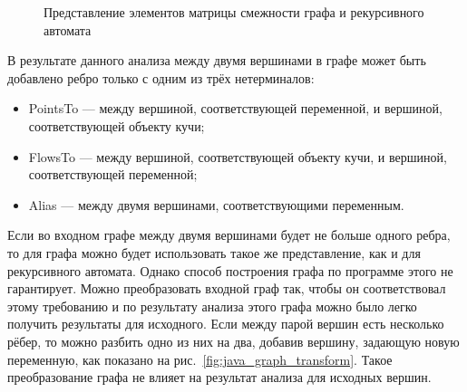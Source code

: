 \begin{figure}[h!]
  \centering
  \caption{Представление элементов матрицы смежности графа и рекурсивного автомата}
  \label{fig:java_graph_representation}
\end{figure}

В результате данного анализа между двумя вершинами в графе может быть добавлено ребро только с одним из трёх нетерминалов:
\begin{itemize}
    \item PointsTo --- между вершиной, соответствующей переменной, и вершиной, соответствующей объекту кучи;
    \item FlowsTo --- между вершиной, соответствующей объекту кучи, и вершиной, соответствующей переменной;
    \item Alias --- между двумя вершинами, соответствующими переменным.
\end{itemize}

Если во входном графе между двумя вершинами будет не больше одного ребра, то для графа можно будет использовать такое же представление, как и для рекурсивного автомата. Однако способ построения графа по программе этого не гарантирует. Можно преобразовать входной граф так, чтобы он соответствовал этому требованию и по результату анализа этого графа можно было легко получить результаты для исходного. Если между парой вершин есть несколько рёбер, то можно разбить одно из них на два, добавив вершину, задающую новую переменную, как показано на рис.~\ref{fig:java_graph_transform}. Такое преобразование графа не влияет на результат анализа для исходных вершин.

